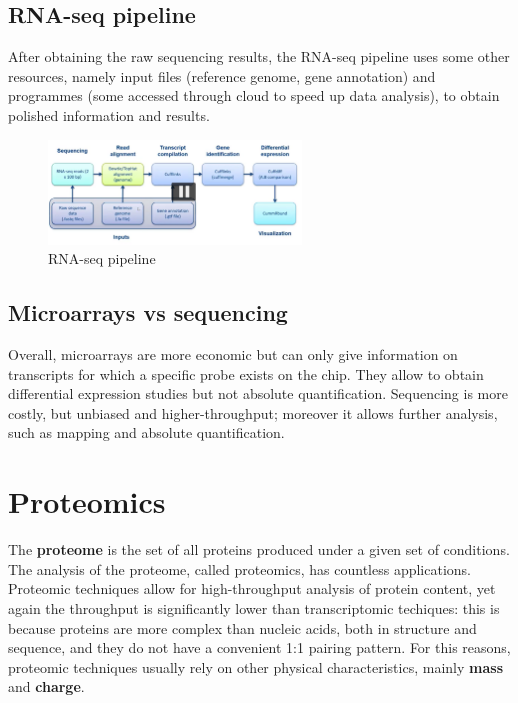     \subsection{RNA-seq pipeline}
      After obtaining the raw sequencing results, the RNA-seq pipeline uses some other resources, namely input files (reference genome, gene annotation) and programmes (some accessed through cloud to speed up data analysis), to obtain polished information and results.

      \begin{figure}[h]
      \caption{RNA-seq pipeline}
      \centering
      \includegraphics[width=0.6\textwidth]{RNAseqpipeline.PNG}
      \end{figure}

    \subsection{Microarrays vs sequencing}
      Overall, microarrays are more economic but can only give information on transcripts for which a specific probe exists on the chip. They allow to obtain differential expression studies but not absolute quantification. Sequencing is more costly, but unbiased and higher-throughput; moreover it allows further analysis, such as mapping and absolute quantification.

  \section{Proteomics}
    The \textbf{proteome} is the set of all proteins produced under a given set of conditions. The analysis of the proteome, called proteomics, has countless applications. Proteomic techniques allow for high-throughput analysis of protein content, yet again the throughput is significantly lower than transcriptomic techiques: this is because proteins are more complex than nucleic acids, both in structure and sequence, and they do not have a convenient 1:1 pairing pattern. For this reasons, proteomic techniques usually rely on other physical characteristics, mainly \textbf{mass} and \textbf{charge}.


